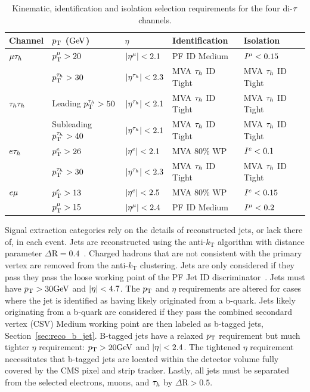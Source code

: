 \begin{table}[htbp]
\centering
\begin{small}
\begin{tabular}{l|l|l|l|l}
  Channel       & $p_\mathrm{T}$ ($\mathrm{GeV}$) & $\eta$ & Identification & Isolation \\
\hline
  $\mu\tau_{h}$       &   $p_\mathrm{T}^{\mu}>20$     &  $\lvert\eta^{\mu}\rvert<2.1$    &   PF ID Medium &  $I^{\mu}<0.15$       \\
                   &   $p_\mathrm{T}^{\tau_{h}}>30$  &  $\lvert\eta^{\tau_{h}}\rvert<2.3$ &   MVA $\tau_{h}$ ID Tight & MVA $\tau_{h}$ ID Tight \\
\hline
 $\tau_{h}\tau_{h}$      &   Leading $p_\mathrm{T}^{\tau_{h}}>50$ & $\lvert\eta^{\tau_{h}}\rvert<2.1$  &    MVA $\tau_{h}$ ID Tight    & MVA $\tau_{h}$ ID Tight    \\
                   &   Subleading $p_\mathrm{T}^{\tau_{h}}>40$ & $\lvert\eta^{\tau_{h}}\rvert<2.1$  &    MVA $\tau_{h}$ ID Tight & MVA $\tau_{h}$ ID Tight    \\
\hline
  $e\tau_{h}$       &   $p_\mathrm{T}^{e}>26$      & $\lvert\eta^{e}\rvert<2.1$       &   MVA 80\% WP  &  $I^{e}<0.1$  \\
                   &   $p_\mathrm{T}^{\tau_{h}}>30$  &  $\lvert\eta^{\tau_{h}}\rvert<2.3$  &   MVA $\tau_{h}$ ID Tight & MVA $\tau_{h}$ ID Tight \\
\hline
  $e\mu$        &   $p_\mathrm{T}^{e}>13$    & $\lvert\eta^{e}\rvert<2.5$   &   MVA 80\% WP   & $I^{e}<0.15$   \\
                   &   $p_\mathrm{T}^{\mu}>15$   & $\lvert\eta^{\mu}\rvert<2.4$  & PF ID Medium &  $I^{\mu}<0.2$    \\
\hline
\end{tabular}
\end{small}
\caption{Kinematic, identification and isolation selection requirements for the four di-$\tau$ channels.
\label{tab:htt_obj_selection}
}
\end{table}


Signal extraction categories rely on the details of reconstructed jets, or
lack there of, in each event. Jets are reconstructed using the anti-$k_{\text{T}}$ algorithm with distance
parameter $\Delta\text{R}=0.4$~\cite{Cacciari:2008gp}. Charged hadrons that are not consistent with
the primary vertex are removed from the anti-$k_{\text{T}}$ clustering.  Jets are only considered
if they pass they pass the loose working point of the PF Jet ID discriminator~\cite{jetID}.
Jets must have $p_\mathrm{T} > 30 \mathrm{GeV}$ and $\lvert\eta\rvert<4.7$. The $p_\mathrm{T}$ and $\eta$ requirements are altered
for cases where the jet is identified as having likely originated from a b-quark. Jets likely originating
from a b-quark are considered if they pass the combined secondard vertex (CSV) Medium working point 
are then labeled as b-tagged jets, Section~\ref{sec:reco_b_jet}.
B-tagged jets have a relaxed $p_\mathrm{T}$ requirement but much tighter $\eta$ requirement: $p_\mathrm{T} > 20 \mathrm{GeV}$ 
and $\lvert\eta\rvert<2.4$.  The tightened $\eta$ requirement necessitates that b-tagged jets are located within
the detector volume fully covered by the CMS pixel and strip tracker.
Lastly, all jets must be separated from the selected electrons, muons, and $\tau_{h}$ by $\Delta\text{R}>0.5$.

